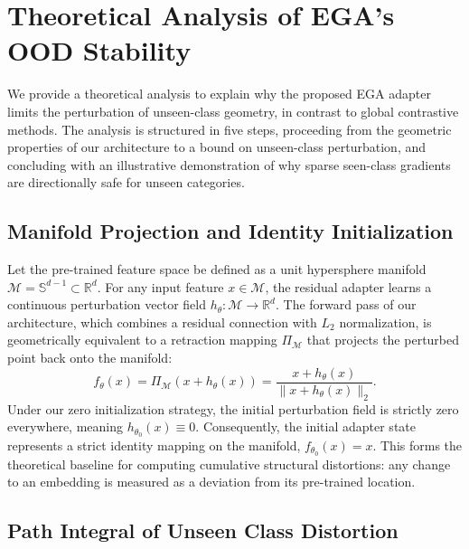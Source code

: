 \documentclass{article}
\begin{document}



% 
\clearpage
\appendix

\section{Theoretical Analysis of EGA's OOD Stability}
\label{sec:appendix_theory}

We provide a theoretical analysis to explain why the proposed EGA adapter limits the perturbation of unseen-class geometry, in contrast to global contrastive methods.
The analysis is structured in five steps, proceeding from the geometric properties of our architecture to a bound on unseen-class perturbation, and concluding with an illustrative demonstration of why sparse seen-class gradients are directionally safe for unseen categories.

\subsection{Manifold Projection and Identity Initialization}

Let the pre-trained feature space be defined as a unit hypersphere manifold $\mathcal{M} = \mathbb{S}^{d-1} \subset \mathbb{R}^d$.
For any input feature $x \in \mathcal{M}$, the residual adapter learns a continuous perturbation vector field $h_\theta: \mathcal{M} \rightarrow \mathbb{R}^d$.
The forward pass of our architecture, which combines a residual connection with $L_2$ normalization, is geometrically equivalent to a retraction mapping $\Pi_{\mathcal{M}}$ that projects the perturbed point back onto the manifold:
\begin{equation}
	f_\theta(x) = \Pi_{\mathcal{M}}(x + h_\theta(x)) = \frac{x + h_\theta(x)}{\|x + h_\theta(x)\|_2}.
\end{equation}
Under our zero initialization strategy, the initial perturbation field is strictly zero everywhere, meaning $h_{\theta_0}(x) \equiv 0$.
Consequently, the initial adapter state represents a strict identity mapping on the manifold, $f_{\theta_0}(x) = x$.
This forms the theoretical baseline for computing cumulative structural distortions: any change to an embedding is measured as a deviation from its pre-trained location.

\subsection{Path Integral of Unseen Class Distortion}
\end{document}

